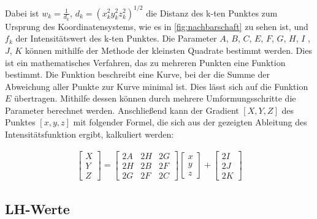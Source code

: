 Dabei ist $w_{k} = \frac{1}{d_{k}}$, $d_{k} =(x_{k}^2y_{k}^2z_{k}^2)^{1/2}$  die Distanz des k-ten Punktes zum Ursprung des Koordinatensystems, wie es in \autoref{fig:nachbarschaft} zu sehen ist, und $f_{k}$ der Intensitätswert des k-ten Punktes. 
\newline
Die Parameter $A$, $B$, $C$, $E$, $F$, $G$, $H$, $I$ ,$J$, $K$  können mithilfe der Methode der kleinsten Quadrate bestimmt werden. Dies ist ein mathematisches Verfahren, das zu mehreren Punkten eine Funktion bestimmt. Die Funktion beschreibt eine Kurve, bei der die Summe der Abweichung aller Punkte zur Kurve minimal ist. Dies lässt sich auf die Funktion $E$ übertragen. Mithilfe dessen können durch mehrere Umformungsschritte die Parameter berechnet werden. Anschließend kann der Gradient $[X, Y, Z]$ des Punktes $[x, y, z]$ mit folgender Formel, die sich aus der gezeigten Ableitung des Intensitätsfunktion ergibt, kalkuliert werden:


\begin{align}
\begin{bmatrix}
           X \\
           Y \\
           Z
         \end{bmatrix}    
 	= \begin{bmatrix}
           2A & 2H & 2G \\
           2H & 2B & 2F \\
           2G & 2F & 2C
         \end{bmatrix}
         \begin{bmatrix}
           x \\
           y \\
           z
         \end{bmatrix}
	+\begin{bmatrix}
           2I \\
           2J \\
           2K
         \end{bmatrix}
  \end{align}



\subsection{LH-Werte}

